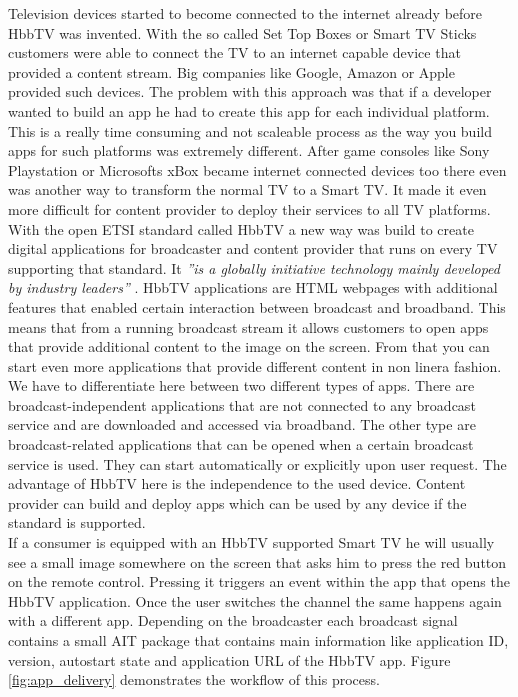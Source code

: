 Television devices started to become connected to the internet already before HbbTV was invented. With
the so called Set Top Boxes or Smart TV Sticks customers were able to connect the TV to an internet
capable device that provided a content stream. Big companies like Google, Amazon or Apple provided such
devices. The problem with this approach was that if a developer wanted to build an app he had to create
this app for each individual platform. This is a really time consuming and not scaleable process as
the way you build apps for such platforms was extremely different. After game consoles like Sony Playstation
or Microsofts xBox became internet connected devices too there even was another way to transform
the normal TV to a Smart TV. It made it even more difficult for content provider to deploy their services
to all TV platforms.\\
With the open ETSI standard called HbbTV a new way was build to create digital applications for
broadcaster and content provider that runs on every TV supporting that standard. It \textit{''is
a globally initiative technology mainly developed by industry leaders''} \cite{zte}. HbbTV
applications are HTML webpages with additional features that enabled certain interaction between
broadcast and broadband. This means that from a running broadcast stream it allows customers
to open apps that provide additional content to the image on the screen. From that you can start
even more applications that provide different content in non linera fashion. We have to differentiate
here between two different types of apps. There are broadcast-independent applications that are not
connected to any broadcast service and are downloaded and accessed via broadband. The other type are
broadcast-related applications that can be opened when a certain broadcast service is used. They
can start automatically or explicitly upon user request. The advantage of HbbTV here is the independence
to the used device. Content provider can build and deploy apps which can be used by any device if the
standard is supported.\\
If a consumer is equipped with an HbbTV supported Smart TV he will usually see a small image somewhere
on the screen that asks him to press the red button on the remote control. Pressing it triggers an
event within the app that opens the HbbTV application. Once the user switches the channel the same
happens again with a different app. Depending on the broadcaster each broadcast signal contains
a small AIT package that contains main information like application ID, version, autostart state and
application URL of the HbbTV app. Figure \ref{fig:app_delivery} demonstrates the workflow of this
process.

